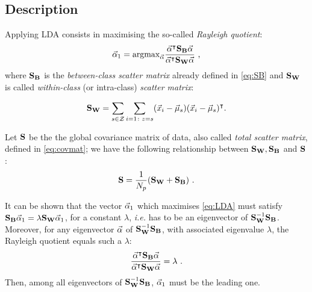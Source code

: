 \subsection{Description} Applying LDA consists in maximising the so-called {\em Rayleigh quotient}:
 \begin{equation}\label{eq:LDA}
 \vec{\alpha}_1=\mathrm{argmax}_{\vec{\alpha}} \frac{\vec{\alpha}^\intercal \textbf{S}_{\textbf{B}} \vec{\alpha}}{\vec{\alpha}^\intercal \textbf{S}_{\textbf{W}} \vec{\alpha}} \mbox{ ,}
 \end{equation}
where $\textbf{S}_{\textbf{B}}$ is the {\em between-class scatter matrix} already defined in \eqref{eq:SB} and $\textbf{S}_{\textbf{W}}$ is called 
{\em within-class} (or intra-class) {\em scatter matrix}:

\begin{equation}
\textbf{S}_{\textbf{W}} = \sum_{s\in\mathcal{Z}}\sum_{i=1\colon z=s}(\vec{x}_i-\vec{\mu}_{s})(\vec{x}_i-\vec{\mu}_{s})^\intercal \mbox{.}
\end{equation}


\begin{remark}
Let $\textbf{S}$ be the the global covariance matrix of data, also called {\em total scatter matrix}, defined in \eqref{eq:covmat}; we have the following relationship between $\textbf{S}_{\textbf{W}},\textbf{S}_{\textbf{B}}$ and $\textbf{S}$:
\begin{equation}
\textbf{S} = \frac{1}{N_p}(\textbf{S}_{\textbf{W}} + \textbf{S}_{\textbf{B}}) \mbox{ .}
\end{equation}
\end{remark}

It can be shown that the vector $\vec{\alpha}_1$ which maximises \eqref{eq:LDA} must satisfy $\textbf{S}_{\textbf{B}}\vec{\alpha}_1 = \lambda \textbf{S}_{\textbf{W}} \vec{\alpha}_1$, for a constant $\lambda$, \textit{i.e.} has to be an eigenvector of $\textbf{S}_{\textbf{W}}^{-1} \textbf{S}_{\textbf{B}}$. Moreover, for any eigenvector $\vec{\alpha}$ of $\textbf{S}_{\textbf{W}}^{-1}\textbf{S}_{\textbf{B}}$, with associated eigenvalue $\lambda$, the Rayleigh quotient equals such a $\lambda$:
\begin{equation}\label{eq:lambdas}
\frac{\vec{\alpha}^\intercal \textbf{S}_{\textbf{B}} \vec{\alpha}}{\vec{\alpha}^\intercal \textbf{S}_{\textbf{W}} \vec{\alpha}} = \lambda \mbox{ .}
\end{equation}
Then, among all eigenvectors of $\textbf{S}_{\textbf{W}}^{-1} \textbf{S}_{\textbf{B}}$, $\vec{\alpha}_1$ must be the leading one. \\

